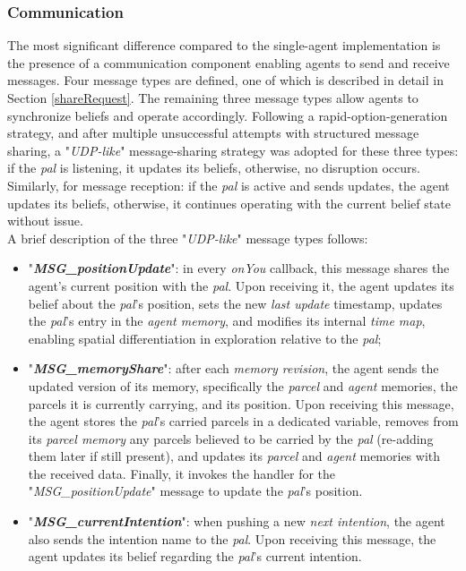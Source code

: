             
        \subsubsection{Communication}            
            The most significant difference compared to the single-agent implementation is the presence of a communication component enabling agents to send and receive messages. Four message types are defined, one of which is described in detail in Section \ref{shareRequest}. The remaining three message types allow agents to synchronize beliefs and operate accordingly. Following a rapid-option-generation strategy, and after multiple unsuccessful attempts with structured message sharing, a "\textit{UDP-like}" message-sharing strategy was adopted for these three types: if the \textit{pal} is listening, it updates its beliefs, otherwise, no disruption occurs. Similarly, for message reception: if the \textit{pal} is active and sends updates, the agent updates its beliefs, otherwise, it continues operating with the current belief state without issue.
            \medskip\\
            A brief description of the three "\textit{UDP-like}" message types follows:
            \begin{itemize}
                \item "\textbf{\textit{MSG\_positionUpdate}}": in every \textit{onYou} callback, this message shares the agent's current position with the \textit{pal}. Upon receiving it, the agent updates its belief about the \textit{pal}'s position, sets the new \textit{last update} timestamp, updates the \textit{pal}'s entry in the \textit{agent memory}, and modifies its internal \textit{time map}, enabling spatial differentiation in exploration relative to the \textit{pal};                    
                \item "\textbf{\textit{MSG\_memoryShare}}": after each \textit{memory revision}, the agent sends the updated version of its memory, specifically the \textit{parcel} and \textit{agent} memories, the parcels it is currently carrying, and its position. Upon receiving this message, the agent stores the \textit{pal}'s carried parcels in a dedicated variable, removes from its \textit{parcel memory} any parcels believed to be carried by the \textit{pal} (re-adding them later if still present), and updates its \textit{parcel} and \textit{agent} memories with the received data. Finally, it invokes the handler for the "\textit{MSG\_positionUpdate}" message to update the \textit{pal}'s position.
                \item "\textbf{\textit{MSG\_currentIntention}}": when pushing a new \textit{next intention}, the agent also sends the intention name to the \textit{pal}. Upon receiving this message, the agent updates its belief regarding the \textit{pal}'s current intention.
            \end{itemize}
            
